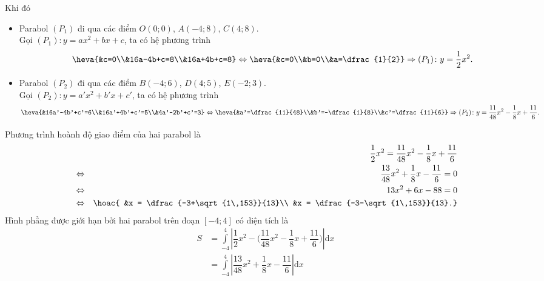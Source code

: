 \begin{ex}
{\begin{center}
		\end{center}
		Khi đó
		\begin{itemize}
			\item Parabol $(P_1)$ đi qua các điểm $O(0;0)$, $A(-4;8)$, $C(4;8)$. \\
			Gọi $(P_1)\colon y=ax^2+bx+c$, ta có hệ phương trình
			\[\heva{&c=0\\&16a-4b+c=8\\&16a+4b+c=8}\Leftrightarrow \heva{&c=0\\&b=0\\&a=\dfrac{1}{2}}\Rightarrow (P_1)\colon y= \dfrac{1}{2}x^2.
			\]
			\item Parabol $(P_2)$ đi qua các điểm $B(-4;6)$, $D(4;5)$, $E(-2;3)$. \\
			Gọi $(P_2)\colon y=a'x^2+b'x+c'$, ta có hệ phương trình
			\[\heva{&16a'-4b'+c'=6\\&16a'+4b'+c'=5\\&4a'-2b'+c'=3}\Leftrightarrow \heva{&a'=\dfrac{11}{48}\\&b'=-\dfrac{1}{8}\\&c'=\dfrac{11}{6}}\Rightarrow (P_2)\colon y = \dfrac{11}{48}x^2-\dfrac{1}{8}x+\dfrac{11}{6}.
			\]
		\end{itemize}
		Phương trình hoành độ giao điểm của hai parabol là
		\allowdisplaybreaks
		\begin{eqnarray*}
			&&\dfrac{1}{2}x^2=\dfrac{11}{48}x^2-\dfrac{1}{8}x+\dfrac{11}{6}\\
			&\Leftrightarrow&\dfrac{13}{48}x^2+\dfrac{1}{8}x-\dfrac{11}{6} = 0\\
			&\Leftrightarrow&13x^2+6x-88 = 0\\
			&\Leftrightarrow&\hoac{
			&x = \dfrac{-3+\sqrt{1\,153}}{13}\\
			&x = \dfrac{-3-\sqrt{1\,153}}{13}.}
		\end{eqnarray*}
		Hình phẳng được giới hạn bởi hai parabol trên đoạn $[-4; 4]$ có diện tích là
		\begin{align*}
			S &= \displaystyle\int\limits_{-4}^{4} \left|\dfrac{1}{2}x^2-\bigg(\dfrac{11}{48}x^2-\dfrac{1}{8}x+\dfrac{11}{6}\bigg)\right| \mathrm{d}x\\
			&= \displaystyle\int\limits_{-4}^{4} \left|\dfrac{13}{48}x^2+\dfrac{1}{8}x-\dfrac{11}{6}\right| \mathrm{d}x\\

\end{align*}}
\end{ex}
